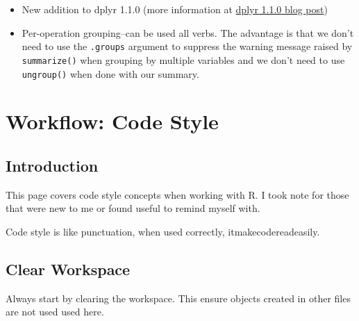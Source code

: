 \documentclass[
  letterpaper,
  DIV=11,
  numbers=noendperiod]{scrreprt}
\providecommand{\tightlist}{%
  \setlength{\itemsep}{0pt}\setlength{\parskip}{0pt}}\usepackage{longtable,booktabs,array}
\begin{document}
\begin{itemize}
  \begin{itemize}
  \tightlist
  \item
    New addition to dplyr 1.1.0 (more information at
    \href{https://www.tidyverse.org/blog/2023/02/dplyr-1-1-0-per-operation-grouping/}{dplyr
    1.1.0 blog post})
  \item
    Per-operation grouping--can be used all verbs. The advantage is that
    we don't need to use the \texttt{.groups} argument to suppress the
    warning message raised by \texttt{summarize()} when grouping by
    multiple variables and we don't need to use \texttt{ungroup()} when
    done with our summary.
  \end{itemize}
\end{itemize}

\chapter{Workflow: Code Style}\label{workflow-code-style}

\section{Introduction}\label{introduction-3}

This page covers code style concepts when working with R. I took note
for those that were new to me or found useful to remind myself with.

\begin{tcolorbox}[enhanced jigsaw, breakable, toprule=.15mm, titlerule=0mm, coltitle=black, colback=white, arc=.35mm, opacityback=0, left=2mm, colbacktitle=quarto-callout-note-color!10!white, toptitle=1mm, leftrule=.75mm, title=\textcolor{quarto-callout-note-color}{\faInfo}\hspace{0.5em}{Code Style \& Punctuation}, bottomrule=.15mm, bottomtitle=1mm, rightrule=.15mm, opacitybacktitle=0.6, colframe=quarto-callout-note-color-frame]

Code style is like punctuation, when used correctly,
itmakecodereadeasily.

\end{tcolorbox}

\section{Clear Workspace}\label{clear-workspace-4}

Always start by clearing the workspace. This ensure objects created in
other files are not used used here.
\end{document}
